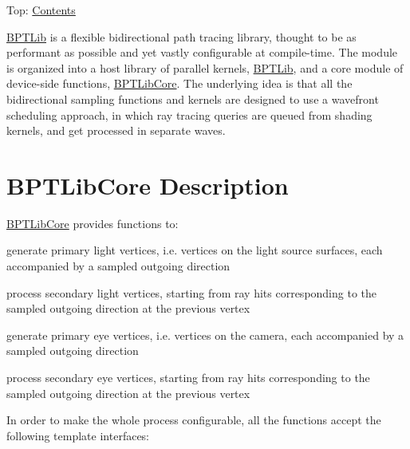 Top\+: \hyperlink{_overture_contents_page}{Contents}

\hyperlink{group___b_p_t_lib}{B\+P\+T\+Lib} is a flexible bidirectional path tracing library, thought to be as performant as possible and yet vastly configurable at compile-\/time. The module is organized into a host library of parallel kernels, \hyperlink{group___b_p_t_lib}{B\+P\+T\+Lib}, and a core module of device-\/side functions, \hyperlink{group___b_p_t_lib_core}{B\+P\+T\+Lib\+Core}. The underlying idea is that all the bidirectional sampling functions and kernels are designed to use a wavefront scheduling approach, in which ray tracing queries are queued from shading kernels, and get processed in separate waves.\hypertarget{_b_p_t_lib_page_BPTLibCoreSection}{}\section{B\+P\+T\+Lib\+Core Description}\label{_b_p_t_lib_page_BPTLibCoreSection}
\begin{DoxyParagraph}{}
\hyperlink{group___b_p_t_lib_core}{B\+P\+T\+Lib\+Core} provides functions to\+:
\begin{DoxyItemize}
\item generate primary light vertices, i.\+e. vertices on the light source surfaces, each accompanied by a sampled outgoing direction
\item process secondary light vertices, starting from ray hits corresponding to the sampled outgoing direction at the previous vertex
\item generate primary eye vertices, i.\+e. vertices on the camera, each accompanied by a sampled outgoing direction
\item process secondary eye vertices, starting from ray hits corresponding to the sampled outgoing direction at the previous vertex 
\end{DoxyItemize}
\end{DoxyParagraph}
\begin{DoxyParagraph}{}
In order to make the whole process configurable, all the functions accept the following template interfaces\+: 
\end{DoxyParagraph}
